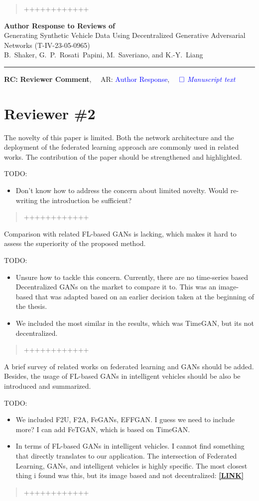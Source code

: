 \documentclass{article}
\def\papertitle{Generating Synthetic Vehicle Data Using Decentralized Generative Adversarial Networks (T-IV-23-05-0965)}
\def\authors{B.~Shaker, G.~P.~Rosati~Papini, M.~Saveriano, and K.-Y.~Liang}
\providecommand{\lettertitle}{Author Response to Reviews of}
\providecommand{\papertitle}{Title}
\providecommand{\authors}{Authors}
\providecommand{\journal}{Journal}
\providecommand{\doi}{--}
\def\headall{
{\Large\bf \lettertitle}\\[1em]
{\Large \papertitle}\\[1em]
{\authors}\\
\hrule

\hfill {\bfseries RC:} \textbf{{Reviewer Comment}},\(\quad\) AR: \textcolor{blue}{Author Response}, \(\quad\textcolor{blue}{\square}\) \emph{\textcolor{blue}{Manuscript text}}}
\begin{document}
\begin{quote}
	++++++++++++
\end{quote}


\newpage
\headall

\section{Reviewer \#2}

\RC The novelty of this paper is limited. Both the network architecture and the deployment of the federated learning approach are commonly used in related works. The contribution of the paper should be strengthened and highlighted.

\AR TODO: 
\begin{itemize}
    \item Don't know how to address the concern about limited novelty. Would re-writing the introduction be sufficient?
\end{itemize}

\begin{quote}
	++++++++++++
\end{quote}

\RC Comparison with related FL-based GANs is lacking, which makes it hard to assess the superiority of the proposed method.

\AR TODO: 
\begin{itemize}
    \item Unsure how to tackle this concern. Currently, there are no time-series based Decentralized GANs on the market to compare it to. This was an image-based that was adapted based on an earlier decision taken at the beginning of the thesis.
    \item We included the most similar in the results, which was TimeGAN, but its not decentralized.
\end{itemize}

\begin{quote}
	++++++++++++
\end{quote}

\RC A brief survey of related works on federated learning and GANs should be added. Besides, the usage of FL-based GANs in intelligent vehicles should be also be introduced and summarized.

\AR TODO: 
\begin{itemize}
    \item We included F2U, F2A, FeGANs, EFFGAN. I guess we need to include more? I can add FeTGAN, which is based on TimeGAN.
    \item In terms of FL-based GANs in intelligent vehicles. I cannot find something that directly translates to our application. The intersection of Federated Learning, GANs, and intelligent vehicles is highly specific. The most closest thing i found was this, but its image based and not decentralized: \href{https://openaccess.thecvf.com/content/WACV2021W/AVV/papers/Xu_Reliability_of_GAN_Generated_Data_to_Train_and_Validate_Perception_WACVW_2021_paper.pdf}{\textbf{[LINK]}}
\end{itemize}

\begin{quote}
	++++++++++++
\end{quote}
\end{document}
